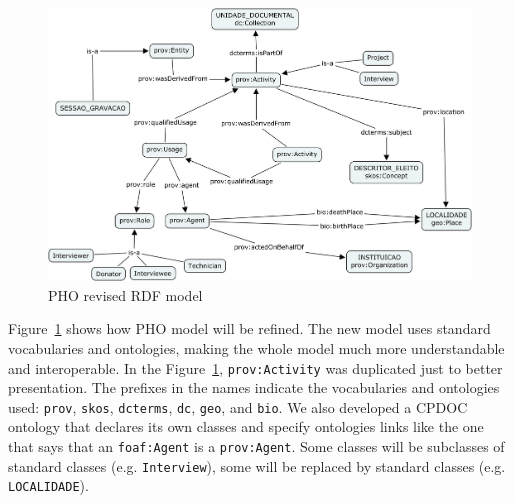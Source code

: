 \begin{figure}[htbp]
  \centering
  \includegraphics[width=.8\textwidth]{pho-new.png}
  \caption{PHO revised RDF model}\label{fig:pho-new}
\end{figure}

Figure~\ref{fig:pho-new} shows how PHO model will be refined. The new
model uses standard vocabularies and ontologies, making the whole
model much more understandable and interoperable. In the
Figure~\ref{fig:pho-new}, \texttt{prov:Activity} was duplicated just
to better presentation. The prefixes in the names indicate the
vocabularies and ontologies used: \texttt{prov}, \texttt{skos},
\texttt{dcterms}, \texttt{dc}, \texttt{geo}, and \texttt{bio}. We also
developed a CPDOC ontology that declares its own classes and specify
ontologies links like the one that says that an \texttt{foaf:Agent} is
a \texttt{prov:Agent}. Some classes will be subclasses of standard
classes (e.g. \texttt{Interview}), some will be replaced by standard
classes (e.g. \texttt{LOCALIDADE}). 

